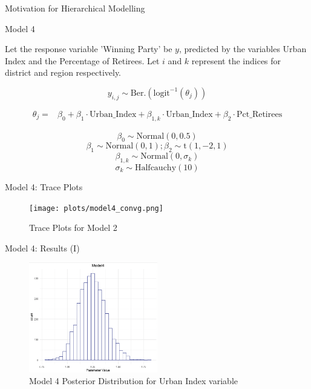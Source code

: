 \documentclass{beamer}
\begin{document}
\begin{frame}{Motivation for Hierarchical Modelling}
\begin{frame}{Model 4}

    Let the response variable 'Winning Party' be \(y\), predicted by the variables Urban Index and the Percentage of Retirees. Let \(i\) and \(k\) represent the indices for district and region respectively.

    \[
    y_{i,j} \sim \text{Ber.}\left(\text{logit}^{-1}(\theta_{j})\right)
    \]

\[
\begin{aligned}
\theta_{j} =    &\beta_0 + \beta_1 \cdot \text{Urban\_Index} + \beta_{1,k} \cdot \text{Urban\_Index} + \beta_2 \cdot \text{Pct\_Retirees}
\end{aligned}
\]

    \[\beta_0 \sim \text{Normal}(0, 0.5)\]
    \[\beta_1 \sim \text{Normal}(0, 1); \beta_2 \sim \text{t}(1,-2,1)\]
    \[\beta_{1,k} \sim \text{Normal}(0, \sigma_k)\]
    \[ \sigma_k \sim \text{Halfcauchy}(10)\]
    
\end{frame}

\begin{frame}{Model 4: Trace Plots}
    \begin{center}
        \begin{figure}
            \texttt{[image: plots/model4\_convg.png]}
            \caption{Trace Plots for Model 2}
        \end{figure}
    \end{center}
\end{frame}


\begin{frame}{Model 4: Results (I)}
    \begin{figure}
        \caption{Model 4 Posterior Distribution for Urban Index variable}
        \includegraphics[width=0.5\textwidth]{plots/model4_postui.png}
    \end{figure}


\end{frame}
\end{frame}
\end{document}
